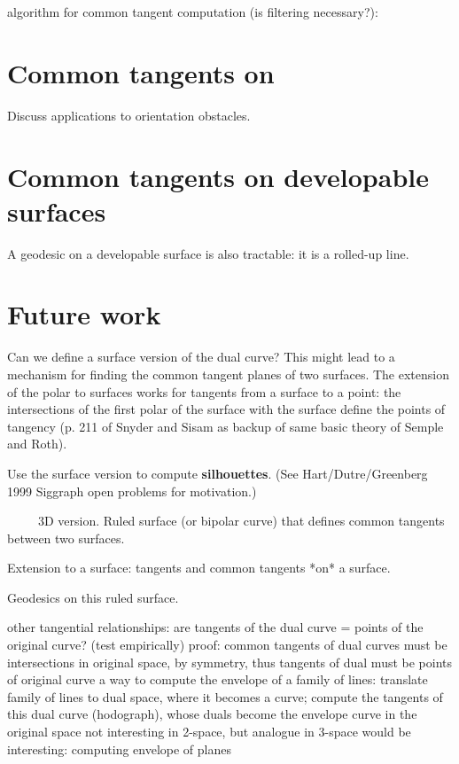 \documentclass[11pt]{article}
\begin{document}
algorithm for common tangent computation (is filtering necessary?):

\section{Common tangents on }

Discuss applications to orientation obstacles.

\section{Common tangents on developable surfaces}

A geodesic on a developable surface is also tractable:
it is a rolled-up line.


\section{Future work}

Can we define a surface version of the dual curve?
This might lead to a mechanism for finding the common tangent planes 
of two surfaces.
The extension of the polar to surfaces works for tangents from a surface
to a point: the intersections of the first polar of the surface with the
surface define the points of tangency (p. 211 of Snyder and Sisam as backup
of same basic theory of Semple and Roth).

Use the surface version to compute {\bf silhouettes}.
(See Hart/Dutre/Greenberg 1999 Siggraph open problems for motivation.)

\ \ \ \ \ 3D version.
Ruled surface (or bipolar curve) that defines common tangents between two surfaces.

Extension to a surface:
tangents and common tangents *on* a surface.

Geodesics on this ruled surface.

other tangential relationships:
are tangents of the dual curve = points of the original curve? (test empirically)
proof: common tangents of dual curves must be intersections in original space, 
	by symmetry, thus tangents of dual must be points of original curve
a way to compute the envelope of a family of lines:
	translate family of lines to dual space, where it becomes a curve;
	compute the tangents of this dual curve (hodograph), 
	whose duals become the envelope curve in the original space
	not interesting in 2-space, but analogue in 3-space would be interesting:
	computing envelope of planes
\end{document}
